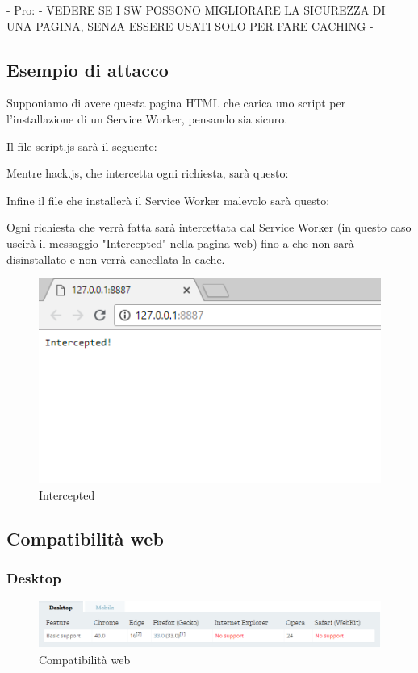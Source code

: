 \documentclass[11pt ,a4paper , twoside , openright ]{article}
\begin{document}
- Pro: - VEDERE SE I SW POSSONO MIGLIORARE LA SICUREZZA DI UNA PAGINA, SENZA ESSERE USATI SOLO PER FARE CACHING -
\newpage
\subsection{Esempio di attacco}
Supponiamo di avere questa pagina HTML che carica uno script per l'installazione di un Service Worker, pensando sia sicuro.

Il file script.js sarà il seguente:


Mentre hack.js, che intercetta ogni richiesta, sarà questo:
\pagebreak

Infine il file che installerà il Service Worker malevolo sarà questo:

Ogni richiesta che verrà fatta sarà intercettata dal Service Worker (in questo caso uscirà il messaggio "Intercepted" nella pagina web) fino a che non sarà disinstallato e non verrà cancellata la cache.
\begin{figure}[h]
	\centering
	\includegraphics[width=0.7\linewidth]{Intercepted}
	\caption{Intercepted}
	\label{fig: Intercepted}
\end{figure}

\newpage
\subsection{Compatibilità web}
\subsubsection{Desktop}
\begin{figure}[h]
	\centering
	\includegraphics[width=1\linewidth]{CompWeb}
	\caption{Compatibilità web}
	\label{fig:Compatibilità web}
\end{figure}
\end{document}
